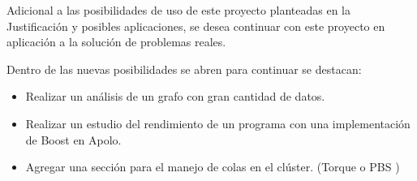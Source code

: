 Adicional a las posibilidades de uso de este proyecto planteadas en la Justificación y posibles aplicaciones, se desea continuar con este proyecto en aplicación a la solución de problemas reales. 

Dentro de las nuevas posibilidades se abren para continuar se destacan: 

\begin{itemize}
	\item Realizar un análisis de un grafo con gran cantidad de datos.
	
	\item Realizar un estudio del rendimiento de un programa con una implementación de Boost en Apolo.

	\item Agregar una sección para el manejo de colas en el clúster. (Torque o PBS )  
	

\end{itemize}